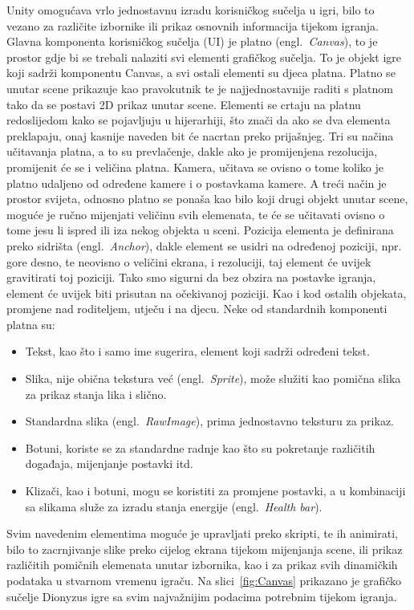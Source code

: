 Unity omogućava vrlo jednostavnu izradu korisničkog sučelja u igri, bilo to vezano za različite izbornike ili prikaz osnovnih informacija tijekom igranja. 
Glavna komponenta korisničkog sučelja (UI) je platno (engl.~\textit{Canvas}), to je prostor gdje bi se trebali nalaziti svi elementi grafičkog sučelja. To je objekt igre koji sadrži komponentu Canvas, a svi ostali elementi su djeca platna. Platno se unutar scene prikazuje kao pravokutnik te je najjednostavnije raditi s platnom tako da se postavi 2D prikaz unutar scene. Elementi se crtaju na platnu redoslijedom kako se pojavljuju u hijerarhiji, što znači da ako se dva elementa preklapaju, onaj kasnije naveden bit će nacrtan preko prijašnjeg. Tri su načina učitavanja platna, a to su prevlačenje, dakle ako je promijenjena rezolucija, promijenit će se i veličina platna. Kamera, učitava se ovisno o tome koliko je platno udaljeno od određene kamere i o postavkama kamere. A treći način je prostor svijeta, odnosno platno se ponaša kao bilo koji drugi objekt unutar scene, moguće je ručno mijenjati veličinu svih elemenata, te će se učitavati ovisno o tome jesu li ispred ili iza nekog objekta u sceni.
Pozicija elementa je definirana preko sidrišta (engl.~\textit{Anchor}), dakle element se usidri na određenoj poziciji, npr. gore desno, te neovisno o veličini ekrana, i rezoluciji, taj element će uvijek gravitirati toj poziciji. Tako smo sigurni da bez obzira na postavke igranja, element će uvijek biti prisutan na očekivanoj poziciji. Kao i kod ostalih objekata, promjene nad roditeljem, utječu i na djecu.
Neke od standardnih komponenti platna su:
\begin{itemize}
  \item Tekst, kao što i samo ime sugerira, element koji sadrži određeni tekst.
  \item Slika, nije obična tekstura već (engl.~\textit{Sprite}), može služiti kao pomična slika za prikaz stanja lika i slično.
  \item Standardna slika (engl.~\textit{RawImage}), prima jednostavno teksturu za prikaz.
  \item Botuni, koriste se za standardne radnje kao što su pokretanje različitih događaja, mijenjanje postavki itd.
  \item Klizači, kao i botuni, mogu se koristiti za promjene postavki, a u kombinaciji sa slikama služe za izradu stanja energije (engl.~\textit{Health bar}).
\end{itemize}
Svim navedenim elementima moguće je upravljati preko skripti, te ih animirati, bilo to zacrnjivanje slike preko cijelog ekrana tijekom mijenjanja scene, ili prikaz različitih pomičnih elemenata unutar izbornika, kao i za prikaz svih dinamičkih podataka u stvarnom vremenu igraču. Na slici~\ref{fig:Canvas} prikazano je grafičko sučelje Dionyzus igre sa svim najvažnijim podacima potrebnim tijekom igranja.
